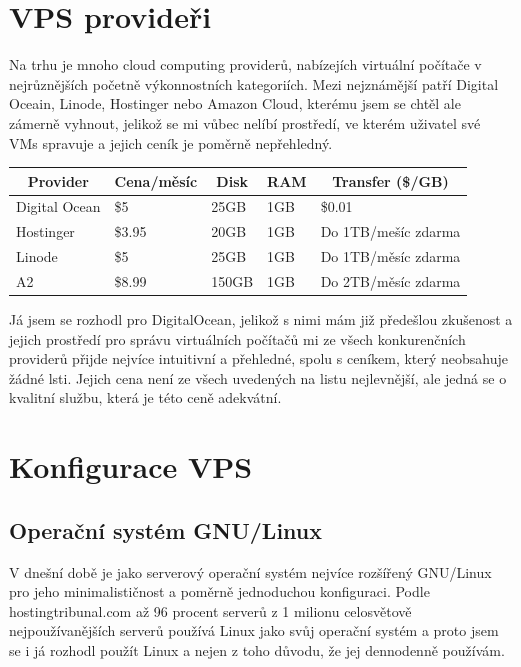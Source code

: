 \documentclass[12pt,a4paper]{report}
\begin{document}
  \section{VPS provideři}
  Na trhu je mnoho cloud computing providerů, nabízejích virtuální počítače
  v nejrůznějších početně výkonnostních kategoriích. Mezi nejznámější patří Digital Oceain,
  Linode, Hostinger nebo Amazon Cloud, kterému jsem se chtěl ale zámerně vyhnout, jelikož se mi vůbec nelíbí 
  prostředí, ve kterém uživatel své VMs spravuje a jejich ceník je poměrně nepřehledný.
  \begin{center}
    \noindent\begin{tabular}{|l|l|l|l|l|}
      \multicolumn{1}{c}{\bfseries Provider} & \multicolumn{1}{c}{\bfseries Cena/měsíc} & \multicolumn{1}{c}{\bfseries Disk} & \multicolumn{1}{c}{\bfseries RAM} & \multicolumn{1}{c}{\bfseries Transfer (\$/GB)} \\ \hline
      Digital Ocean & \$5 & 25GB & 1GB & \$0.01 \\ \hline
      Hostinger & \$3.95 & 20GB & 1GB & Do 1TB/mešíc zdarma \\ \hline
      Linode & \$5 & 25GB & 1GB & Do 1TB/měsíc zdarma \\ \hline
      A2 & \$8.99 & 150GB & 1GB & Do 2TB/měsíc zdarma \\ \hline
    \end{tabular}
  \end{center}
  Já jsem se rozhodl pro DigitalOcean, jelikož s nimi mám již předešlou 
  zkušenost a jejich prostředí pro správu virtuálních počítačů mi ze všech 
  konkurenčních providerů přijde nejvíce intuitivní a přehledné, spolu s ceníkem, 
  který neobsahuje žádné lsti. Jejich cena není ze všech uvedených na listu nejlevnější,
  ale jedná se o kvalitní službu, která je této ceně adekvátní.  
  \section{Konfigurace VPS}
  \subsection{Operační systém GNU/Linux}
  V dnešní době je jako serverový operační systém nejvíce rozšířený GNU/Linux pro jeho
  minimalističnost a poměrně jednoduchou konfiguraci. Podle hostingtribunal.com až 96 procent serverů z
  1 milionu celosvětově nejpoužívanějších serverů používá Linux jako svůj operační systém a proto
  jsem se i já rozhodl použít Linux a nejen z toho důvodu, že jej dennodenně používám.
\end{document}
